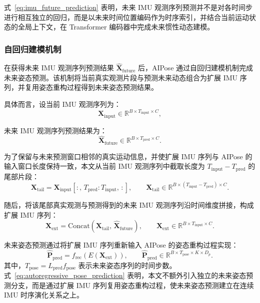式~\eqref{eq:imu_future_prediction} 表明，未来 IMU 观测序列预测并不是对各时间步进行相互独立的回归，而是以未来时间位置编码作为时序索引，并结合当前运动状态的全局上下文，在 Transformer 编码器中完成未来惯性动态建模。

\subsubsection{自回归建模机制}{}

在获得未来 IMU 观测序列预测结果 $\hat{\mathbf{X}}_{\mathrm{future}}$ 后，AIPose 通过自回归建模机制完成未来姿态预测。该机制将当前真实观测片段与预测未来动态组合为扩展 IMU 序列，并复用姿态重构过程得到未来姿态预测结果。

具体而言，设当前 IMU 观测序列为：
\begin{equation}
\mathbf{X}_{\mathrm{input}} \in \mathbb{R}^{B \times T_{\mathrm{input}} \times C},
\label{eq:ar_input_imu}
\end{equation}

未来 IMU 观测序列预测结果为：
\begin{equation}
\hat{\mathbf{X}}_{\mathrm{future}} \in \mathbb{R}^{B \times T_{\mathrm{pred}} \times C}.
\label{eq:ar_future_imu}
\end{equation}

为了保留与未来预测窗口相邻的真实运动信息，并使扩展 IMU 序列与 AIPose 的输入窗口长度保持一致，本文从当前 IMU 观测序列中截取长度为 $T_{\mathrm{input}}-T_{\mathrm{pred}}$ 的尾部片段：
\begin{equation}
\mathbf{X}_{\mathrm{tail}}
=
\mathbf{X}_{\mathrm{input}}[:,\,T_{\mathrm{pred}}:T_{\mathrm{input}},\,:],
\qquad
\mathbf{X}_{\mathrm{tail}} \in \mathbb{R}^{B \times (T_{\mathrm{input}}-T_{\mathrm{pred}}) \times C}.
\label{eq:x_tail}
\end{equation}

随后，将该尾部真实观测与预测得到的未来 IMU 观测序列沿时间维度拼接，构成扩展 IMU 序列：
\begin{equation}
\mathbf{X}_{\mathrm{ext}}
=
\mathrm{Concat}\!\left(
\mathbf{X}_{\mathrm{tail}},\,\hat{\mathbf{X}}_{\mathrm{future}}
\right),
\qquad
\mathbf{X}_{\mathrm{ext}} \in \mathbb{R}^{B \times T_{\mathrm{input}} \times C}.
\label{eq:extended_imu}
\end{equation}

未来姿态预测通过将扩展 IMU 序列重新输入 AIPose 的姿态重构过程实现：
\begin{equation}
\hat{\mathbf{P}}_{\mathrm{pred}}
=
f_{\mathrm{rec}}\!\left(E(\mathbf{X}_{\mathrm{ext}})\right),
\qquad
\hat{\mathbf{P}}_{\mathrm{pred}} \in \mathbb{R}^{B \times T_{\mathrm{pose}} \times K \times D_p}.
\label{eq:autoregressive_pose_prediction}
\end{equation}
其中，$T_{\mathrm{pose}}=L_{\mathrm{pred}}f_{\mathrm{pose}}$ 表示未来姿态序列的时间步数。式~\eqref{eq:autoregressive_pose_prediction} 表明，本文不额外引入独立的未来姿态预测分支，而是通过扩展 IMU 序列复用姿态重构过程，使未来姿态预测建立在连续 IMU 时序演化关系之上。

